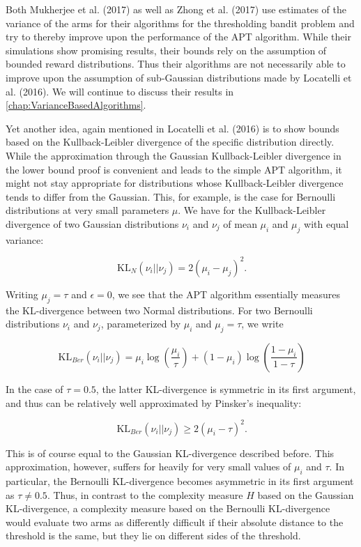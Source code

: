 \documentclass[12pt,]{article}
\newcommand{\KL}{\,\text{KL}}
\begin{document}
Both Mukherjee et al. (2017) as well as Zhong et al. (2017) use
estimates of the variance of the arms for their algorithms for the
thresholding bandit problem and try to thereby improve upon the
performance of the APT algorithm. While their simulations show promising
results, their bounds rely on the assumption of bounded reward
distributions. Thus their algorithms are not necessarily able to improve
upon the assumption of sub-Gaussian distributions made by Locatelli et
al. (2016). We will continue to discuss their results in
\autoref{chap:VarianceBasedAlgorithms}.

Yet another idea, again mentioned in Locatelli et al. (2016) is to show
bounds based on the Kullback-Leibler divergence of the specific
distribution directly. While the approximation through the Gaussian
Kullback-Leibler divergence in the lower bound proof is convenient and
leads to the simple APT algorithm, it might not stay appropriate for
distributions whose Kullback-Leibler divergence tends to differ from the
Gaussian. This, for example, is the case for Bernoulli distributions at
very small parameters \(\mu\). We have for the Kullback-Leibler
divergence of two Gaussian distributions \(\nu_i\) and \(\nu_j\) of mean
\(\mu_i\) and \(\mu_j\) with equal variance:

\[
\KL_{N}(\nu_i || \nu_j) = 2(\mu_i - \mu_j)^2.
\]

Writing \(\mu_j = \tau\) and \(\epsilon = 0\), we see that the APT
algorithm essentially measures the KL-divergence between two Normal
distributions. For two Bernoulli distributions \(\nu_i\) and \(\nu_j\),
parameterized by \(\mu_i\) and \(\mu_j=\tau\), we write

\[
\KL_{Ber}(\nu_i||\nu_j) = \mu_i \log(\frac{\mu_i}{\tau}) + (1-\mu_i) \log(\frac{1-\mu_i}{1-\tau})
\]

In the case of \(\tau = 0.5\), the latter KL-divergence is symmetric in
its first argument, and thus can be relatively well approximated by
Pinsker's inequality:

\[
\KL_{Ber}(\nu_i||\nu_j) \geq 2(\mu_i - \tau)^2.
\]

This is of course equal to the Gaussian KL-divergence described before.
This approximation, however, suffers for heavily for very small values
of \(\mu_i\) and \(\tau\). In particular, the Bernoulli KL-divergence
becomes asymmetric in its first argument as \(\tau \neq 0.5\). Thus, in
contrast to the complexity measure \(H\) based on the Gaussian
KL-divergence, a complexity measure based on the Bernoulli KL-divergence
would evaluate two arms as differently difficult if their absolute
distance to the threshold is the same, but they lie on different sides
of the threshold.
\end{document}
